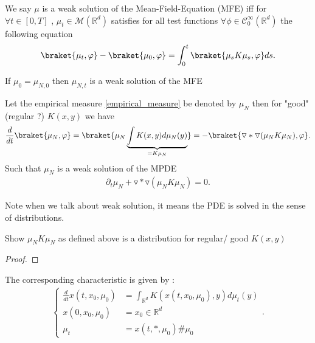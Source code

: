 \begin{definition}
  We say $\mu $ is a weak solution of the Mean-Field-Equation (MFE) iff for $\forall  t \in  [0,T]$ , $\mu_t \in  \mathcal{M}(\mathbb{R}^{d} )$ satisfies for 
  all test functions  $\forall  \phi  \in  \mathcal{C}^{\infty}_0(\mathbb{R}^{d } )$ the following equation
  \begin{align*}
    \braket{\mu_t,\phi } - \braket{\mu_0,\phi } = \int_0^{t}  \braket{\mu_sK\mu_s,\phi } ds
  .\end{align*}
\end{definition}
\begin{remark}
  If $\mu_0 = \mu_{N,0}$  then $\mu_{N,t}$ is a weak solution of the MFE
\end{remark}
\begin{theorem}
Let the empirical measure \ref{empirical_measure} be denoted by $\mu_N$ then for "good" (regular ?)  $K(x,y)$ we have 
\begin{align*}
  \frac{d}{dt} \braket{\mu_N,\phi } = \braket{\mu_N \underbrace{\int K(x,y) d\mu_N(y)}_{=  K \mu_N}}= -\braket{\triangledown * \triangledown(\mu_N K\mu_N),\phi }
.\end{align*}
Such that $\mu_N$ is a weak solution of the MPDE
\begin{align*}
  \partial_t \mu_N + \triangledown * \triangledown(\mu_N K\mu_N) = 0
.\end{align*}  
\end{theorem}
\begin{remark}
 Note when we talk about weak solution, it means the PDE is solved in the sense of distributions.
\end{remark}
\begin{exercise}
 Show $\mu_N K \mu_N$ as defined above is a distribution for regular/ good $K(x,y)$
\end{exercise}
\begin{proof}  
\end{proof}
\begin{definition}\label{characteristic_problem}
  The corresponding characteristic is given by : 
\begin{align*}  
  \begin{cases}
    \frac{d}{dt} x(t,x_0,\mu_0) &= \int_{\mathbb{R}^{d } } K(x(t,x_0,\mu_0),y) d\mu_t(y)\\
    x(0,x_0,\mu_0) &= x_0 \in  \mathbb{R}^{d }  \\
    \mu_t &= x(t,*,\mu_0) \# \mu_0 
  \end{cases}
.\end{align*}
\end{definition}
